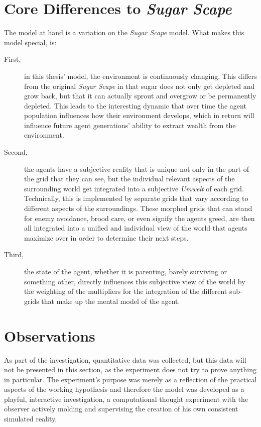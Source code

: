 \section{Core Differences to \textit{Sugar Scape}}
The model at hand is a variation on the \textit{Sugar Scape} model. What makes this model special, is:
\begin{description}
\item[First,] in this thesis' model, the environment is continuously changing. This differs from the original \textit{Sugar Scape} in that sugar does not only get depleted and grow back, but that it can actually sprout and overgrow or be permanently depleted. This leads to the interesting dynamic that over time the agent population influences how their environment develops, which in return will influence future agent generations' ability to extract wealth from the environment.
\item[Second,] the agents have a subjective reality that is unique not only in the part of the grid that they can see, but the individual relevant aspects of the surrounding world get integrated into a subjective \textit{Umwelt} of each grid. Technically, this is implemented by separate grids that vary according to different aspects of the surroundings. These morphed grids that can stand for enemy avoidance, brood care, or even signify the agents greed, are then all integrated into a unified and individual view of the world that agents maximize over in order to determine their next steps.
	\item[Third,] the state of the agent, whether it is parenting, barely surviving or something other, directly influences this subjective view of the world by the weighting of the multipliers for the integration of the different sub-grids that make up the mental model of the agent.
\end{description}
\clearpage
\section{Observations}
As part of the investigation, quantitative data was collected, but this data will not be presented in this section, as the experiment does not try to prove anything in particular. The experiment's purpose was merely as a reflection of the practical aspects of the working hypothesis and therefore the model was developed as a playful, interactive investigation, a computational thought experiment with the observer actively molding and supervising the creation of his own consistent simulated reality.

